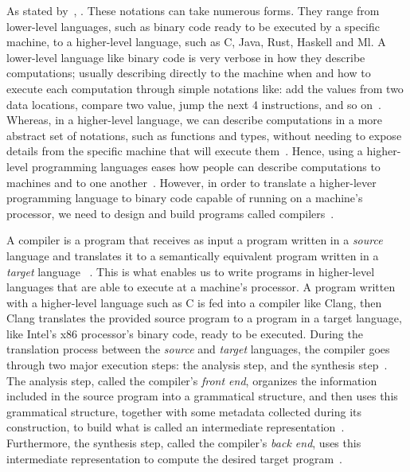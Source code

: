 \documentclass[
    oneside,
    english,
    embeddedlogo,
    noabntexcite
]{ufsc-thesis-rn46-2019}
\begin{document}
As stated by~\textcite{Aho:2006:CPT:1177220}, .
These notations can take numerous forms.
They range from lower-level languages, such as binary code ready to be executed by a specific machine, to a higher-level language, such as C, Java, Rust, Haskell and Ml.
A lower-level language like binary code is very verbose in how they describe computations; usually describing directly to the machine when and how to execute each computation through simple notations like: add the values from two data locations, compare two value, jump the next 4 instructions, and so on~\cite{Aho:2006:CPT:1177220}.
Whereas, in a higher-level language, we can describe computations in a more abstract set of notations, such as functions and types, without needing to expose details from the specific machine that will execute them~\cite{Aho:2006:CPT:1177220}.
Hence, using a higher-level programming languages eases how people can describe computations to machines and to one another~\cite{Aho:2006:CPT:1177220}.
However, in order to translate a higher-lever programming language to binary code capable of running on a machine's processor, we need to design and build programs called compilers~\cite{Aho:2006:CPT:1177220}.

A compiler is a program that receives as input a program written in a \textit{source} language and translates it to a semantically equivalent program written in a \textit{target} language
~\cite{Aho:2006:CPT:1177220}.
This is what enables us to write programs in higher-level languages that are able to execute at a machine's processor.
A program written with a higher-level language such as C is fed into a compiler like Clang, then Clang translates the provided source program to a program in a target language, like Intel's x86 processor's binary code, ready to be executed.
During the translation process between the \textit{source} and \textit{target} languages, the compiler goes through two major execution steps: the analysis step, and the synthesis step~\cite{Aho:2006:CPT:1177220}.
The analysis step, called the compiler's \textit{front end}, organizes the information included in the source program into a grammatical structure, and then uses this grammatical structure, together with some metadata collected during its construction, to build what is called an intermediate representation~\cite{Aho:2006:CPT:1177220}.
Furthermore, the synthesis step, called the compiler's \textit{back end}, uses this intermediate representation to compute the desired target program~\cite{Aho:2006:CPT:1177220}.
\end{document}
